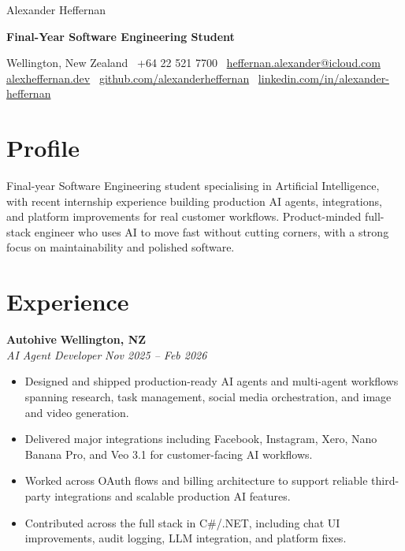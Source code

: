 \documentclass[9pt,letterpaper]{article}
\newcommand{\resumeHeader}[1]{{\displayfont\fontsize{24}{26}\selectfont #1}}
\newcommand{\resumeTitle}[1]{{\fontsize{11.2}{12.8}\selectfont\bfseries\color{ResumeAccent} #1}}
\newcommand{\headerlink}[2]{{\small{\hypersetup{urlcolor=ResumeText}\href{#1}{#2}}}}
\newcommand{\contactrow}[1]{{\small #1}}
\newcommand{\resumeRole}[4]{
  \Needspace{4\baselineskip}
  \vspace{0.12em}
  \textbf{#1} \hfill \textbf{#2} \\
  \textit{\small #3} \hfill \textit{\small #4} \\
  \vspace{0.1em}
}
\begin{document}
\raggedright
\small

\resumeHeader{Alexander Heffernan}

\vspace{0.08em}
\resumeTitle{Final-Year Software Engineering Student}

\vspace{0.42em}
\contactrow{Wellington, New Zealand \textbar\ +64 22 521 7700 \textbar\ \headerlink{mailto:heffernan.alexander@icloud.com}{heffernan.alexander@icloud.com}} \\
\contactrow{\headerlink{https://alexheffernan.dev}{alexheffernan.dev} \textbar\ \headerlink{https://github.com/alexanderheffernan}{github.com/alexanderheffernan} \textbar\ \headerlink{https://linkedin.com/in/alexander-heffernan}{linkedin.com/in/alexander-heffernan}}

\section*{Profile}
Final-year Software Engineering student specialising in Artificial Intelligence, with recent internship experience building production AI agents, integrations, and platform improvements for real customer workflows. Product-minded full-stack engineer who uses AI to move fast without cutting corners, with a strong focus on maintainability and polished software.

\section*{Experience}
\resumeRole{Autohive}{Wellington, NZ}{AI Agent Developer}{Nov 2025 -- Feb 2026}
\begin{itemize}
  \item Designed and shipped production-ready AI agents and multi-agent workflows spanning research, task management, social media orchestration, and image and video generation.
  \item Delivered major integrations including Facebook, Instagram, Xero, Nano Banana Pro, and Veo 3.1 for customer-facing AI workflows.
  \item Worked across OAuth flows and billing architecture to support reliable third-party integrations and scalable production AI features.
  \item Contributed across the full stack in C\#/.NET, including chat UI improvements, audit logging, LLM integration, and platform fixes.
\end{itemize}
\end{document}
